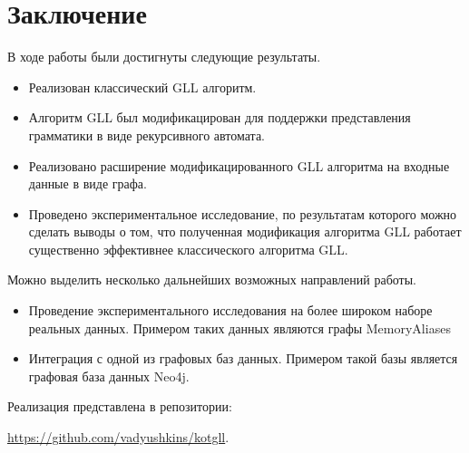 \section*{Заключение}\label{sec:current_results}

В ходе работы были достигнуты следующие результаты.
\begin{itemize}
    \item Реализован классический GLL алгоритм.
    \item Алгоритм GLL был модификацирован для поддержки представления грамматики в виде рекурсивного автомата.
    \item Реализовано расширение модификацированного GLL алгоритма на входные данные в виде графа.
    \item Проведено экспериментальное исследование, по результатам которого можно сделать выводы о том, что полученная модификация алгоритма GLL работает существенно эффективнее классического алгоритма GLL.
\end{itemize}

Можно выделить несколько дальнейших возможных направлений работы.
\begin{itemize}
    \item Проведение экспериментального исследования на более широком наборе реальных данных. Примером таких данных являются графы MemoryAliases~\cite{GC}
    \item Интеграция с одной из графовых баз данных. Примером такой базы является графовая база данных Neo4j.
\end{itemize}

Реализация представлена в репозитории:

\url{https://github.com/vadyushkins/kotgll}.
